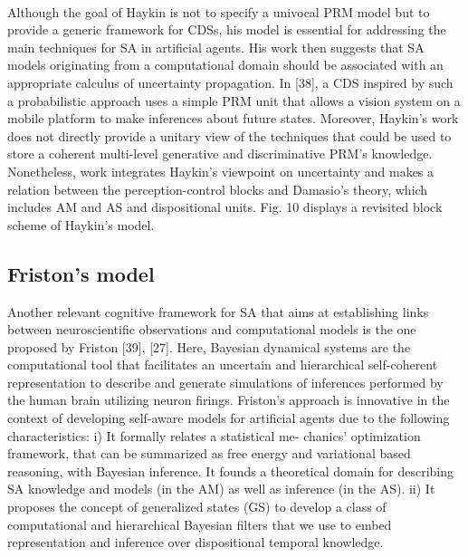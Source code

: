 \documentclass{article}
\begin{document}
		\paragraph{}Although the goal of Haykin is not to specify a univocal PRM model but to provide a generic framework for CDSs, his model is essential for addressing the main techniques for SA in artificial agents. His work then suggests that SA models originating from a computational domain should be associated with an appropriate calculus of uncertainty propagation. In \citet{regazzoni-2020-multi-sensorial-generative-and-descriptive-self-awareness-models-for-autonomous-systems}[38], a CDS inspired by such a probabilistic approach uses a simple PRM unit that allows a vision system on a mobile platform to make inferences about future states. Moreover, Haykin’s work does not directly provide a unitary view of the techniques that could be used to store a coherent multi-level generative and discriminative PRM’s knowledge. Nonetheless, \cite{regazzoni-2020-multi-sensorial-generative-and-descriptive-self-awareness-models-for-autonomous-systems} work
		integrates Haykin’s viewpoint on uncertainty and makes a relation between the perception-control blocks and Damasio’s
		theory, which includes AM and AS and dispositional units.
		\cite{regazzoni-2020-multi-sensorial-generative-and-descriptive-self-awareness-models-for-autonomous-systems}Fig. 10 displays a revisited block scheme of Haykin’s model.
		
		\subsection{Friston’s model}
		Another relevant cognitive framework for SA that aims at
		establishing links between neuroscientific observations and
		computational models is the one proposed by Friston \citet{regazzoni-2020-multi-sensorial-generative-and-descriptive-self-awareness-models-for-autonomous-systems}[39],
		\citet{regazzoni-2020-multi-sensorial-generative-and-descriptive-self-awareness-models-for-autonomous-systems}[27]. Here, Bayesian dynamical systems are the computational
		tool that facilitates an uncertain and hierarchical self-coherent representation to describe and generate simulations
		of inferences performed by the human brain utilizing neuron firings. Friston’s approach is innovative in the context of
		developing self-aware models for artificial agents due to the following characteristics: i) It formally relates a statistical me-
		chanics’ optimization framework, that can be summarized as free energy and variational based reasoning, with Bayesian
		inference. It founds a theoretical domain for describing SA knowledge and models (in the AM) as well as inference (in
		the AS). ii) It proposes the concept of generalized states (GS) to develop a class of computational and hierarchical Bayesian
		filters that we use to embed representation and inference over dispositional temporal knowledge.
\end{document}
